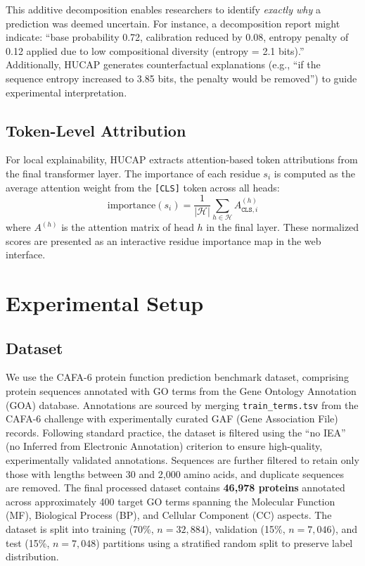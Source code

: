 \documentclass[conference]{IEEEtran}
\begin{document}
This additive decomposition enables researchers to identify \textit{exactly why} a prediction was deemed uncertain. For instance, a decomposition report might indicate: ``base probability 0.72, calibration reduced by 0.08, entropy penalty of 0.12 applied due to low compositional diversity (entropy = 2.1 bits).'' Additionally, HUCAP generates counterfactual explanations (e.g., ``if the sequence entropy increased to 3.85 bits, the penalty would be removed'') to guide experimental interpretation.

\subsection{Token-Level Attribution}

For local explainability, HUCAP extracts attention-based token attributions from the final transformer layer. The importance of each residue $s_i$ is computed as the average attention weight from the \texttt{[CLS]} token across all heads:
\begin{equation}
    \text{importance}(s_i) = \frac{1}{|\mathcal{H}|} \sum_{h \in \mathcal{H}} A^{(h)}_{\texttt{CLS}, i}
\end{equation}
where $A^{(h)}$ is the attention matrix of head $h$ in the final layer. These normalized scores are presented as an interactive residue importance map in the web interface.

\section{Experimental Setup}

\subsection{Dataset}
We use the CAFA-6 protein function prediction benchmark dataset, comprising protein sequences annotated with GO terms from the Gene Ontology Annotation (GOA) database. Annotations are sourced by merging \texttt{train\_terms.tsv} from the CAFA-6 challenge with experimentally curated GAF (Gene Association File) records. Following standard practice, the dataset is filtered using the ``no IEA'' (no Inferred from Electronic Annotation) criterion to ensure high-quality, experimentally validated annotations. Sequences are further filtered to retain only those with lengths between 30 and 2{,}000 amino acids, and duplicate sequences are removed. The final processed dataset contains \textbf{46{,}978 proteins} annotated across approximately 400 target GO terms spanning the Molecular Function (MF), Biological Process (BP), and Cellular Component (CC) aspects. The dataset is split into training (70\%, $n = 32{,}884$), validation (15\%, $n = 7{,}046$), and test (15\%, $n = 7{,}048$) partitions using a stratified random split to preserve label distribution.
\end{document}
